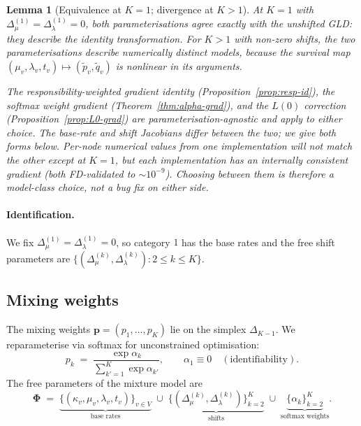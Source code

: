\documentclass[11pt]{article}
\newcommand{\rate}{\kappa}
\newcommand{\dup}{\lambda}
\newcommand{\loss}{\mu}
\newcommand{\edgelen}{t}
\newcommand{\survp}{\tilde p}
\newcommand{\survq}{\tilde q}
\newtheorem{lemma}[theorem]{Lemma}
\theoremstyle{definition}
\begin{document}
\begin{lemma}[Equivalence at $K=1$; divergence at $K>1$]
\label{lem:rate-level-shift}
At $K = 1$ with $\Delta_\loss^{(1)} = \Delta_\dup^{(1)} = 0$, both
parameterisations agree exactly with the unshifted GLD: they
describe the identity transformation.  For $K > 1$ with non-zero
shifts, the two parameterisations describe
\emph{numerically distinct models}, because the survival map
$(\loss_v, \dup_v, \edgelen_v) \mapsto (\survp_v, \survq_v)$ is
nonlinear in its arguments.

The responsibility-weighted gradient identity
(Proposition~\ref{prop:resp-id}), the softmax weight gradient
(Theorem~\ref{thm:alpha-grad}), and the $L(0)$ correction
(Proposition~\ref{prop:L0-grad}) are
\emph{parameterisation-agnostic} and apply to either choice. The
base-rate and shift Jacobians differ between the two; we give both
forms below. Per-node numerical values from one
implementation will not match the other except at $K=1$, but each
implementation has an internally consistent gradient (both
FD-validated to $\sim 10^{-9}$). Choosing between them is therefore
a model-class choice, not a bug fix on either side.
\end{lemma}

\paragraph{Identification.}
We fix $\Delta_\loss^{(1)} = \Delta_\dup^{(1)} = 0$, so category $1$
has the base rates and the free shift parameters are
$\{(\Delta_\loss^{(k)}, \Delta_\dup^{(k)}) : 2\le k\le K\}$.

\subsection{Mixing weights}

The mixing weights $\bm p = (p_1, \dots, p_K)$ lie on the simplex
$\Delta_{K-1}$. We reparameterise via softmax for unconstrained
optimisation:
\begin{equation}
p_k \;=\; \frac{\exp \alpha_k}{\sum_{k'=1}^K \exp\alpha_{k'}},
\qquad
\alpha_1 \equiv 0 \quad (\text{identifiability}).
\label{eq:softmax}
\end{equation}
The free parameters of the mixture model are
\begin{equation}
\bm\Phi \;=\;
\underbrace{\{(\rate_v, \loss_v, \dup_v, \edgelen_v)\}_{v\in V}}_{\text{base rates}}
\;\cup\;
\underbrace{\{(\Delta_\loss^{(k)}, \Delta_\dup^{(k)})\}_{k=2}^K}_{\text{shifts}}
\;\cup\;
\underbrace{\{\alpha_k\}_{k=2}^K}_{\text{softmax weights}}.
\label{eq:Phi}
\end{equation}
\end{document}
